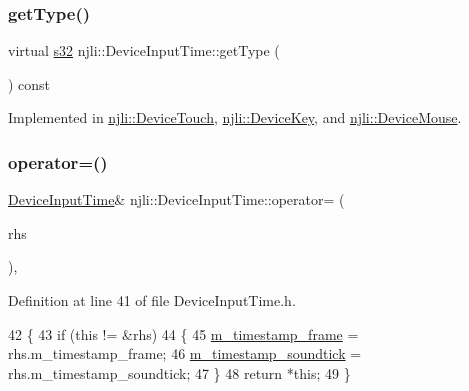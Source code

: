 \subsubsection{\texorpdfstring{get\+Type()}{getType()}}
{\footnotesize\ttfamily virtual \mbox{\hyperlink{_util_8h_aa62c75d314a0d1f37f79c4b73b2292e2}{s32}} njli\+::\+Device\+Input\+Time\+::get\+Type (\begin{DoxyParamCaption}{ }\end{DoxyParamCaption}) const\hspace{0.3cm}{\ttfamily [pure virtual]}}



Implemented in \mbox{\hyperlink{classnjli_1_1_device_touch_a1920ad95ef19b482f4285c44a1675ee6}{njli\+::\+Device\+Touch}}, \mbox{\hyperlink{classnjli_1_1_device_key_aa7b5696085bd6c8a1a935d422ae51e1f}{njli\+::\+Device\+Key}}, and \mbox{\hyperlink{classnjli_1_1_device_mouse_acfb2479b7c88042d6fb5ce58b4482264}{njli\+::\+Device\+Mouse}}.

\mbox{\label{classnjli_1_1_device_input_time_ab1ca58d01db67a7ca5eb57bbbe07d929}} 
\subsubsection{\texorpdfstring{operator=()}{operator=()}}
{\footnotesize\ttfamily \mbox{\hyperlink{classnjli_1_1_device_input_time}{Device\+Input\+Time}}\& njli\+::\+Device\+Input\+Time\+::operator= (\begin{DoxyParamCaption}\item[{const \mbox{\hyperlink{classnjli_1_1_device_input_time}{Device\+Input\+Time}} \&}]{rhs }\end{DoxyParamCaption})\hspace{0.3cm}{\ttfamily [inline]}, {\ttfamily [protected]}}



Definition at line 41 of file Device\+Input\+Time.\+h.


\begin{DoxyCode}
42     \{
43       \textcolor{keywordflow}{if} (\textcolor{keyword}{this} != &rhs)
44         \{
45           \mbox{\hyperlink{classnjli_1_1_device_input_time_a798d29d739522cad83bd37986ed15a20}{m\_timestamp\_frame}} = rhs.m\_timestamp\_frame;
46           \mbox{\hyperlink{classnjli_1_1_device_input_time_a20e05f326dd3a3836a549cba6b536e85}{m\_timestamp\_soundtick}} = rhs.m\_timestamp\_soundtick;
47         \}
48       \textcolor{keywordflow}{return} *\textcolor{keyword}{this};
49     \}
\end{DoxyCode}
\mbox{\label{classnjli_1_1_device_input_time_a03eca1e2b0725a5be925f6ec5cd33b7b}} 
